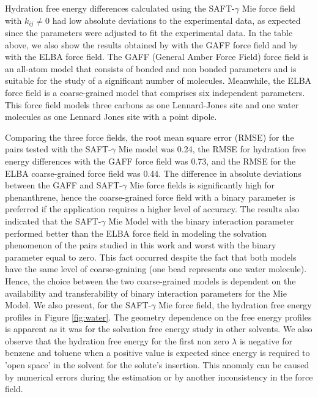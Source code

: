 Hydration free energy differences calculated using the SAFT-$\gamma$ Mie force field with $k_{ij} \neq 0$ had low absolute deviations to the experimental data, as expected since the parameters were adjusted to fit the experimental data. In the table above, we also show the results obtained by  with the GAFF force field and by  with the ELBA force field. The GAFF (General Amber Force Field) force field is an all-atom model that consists of bonded and non bonded parameters and is suitable for the study of a significant number of molecules. Meanwhile, the ELBA force field is a coarse-grained model that comprises six independent parameters. This force field models three carbons as one Lennard-Jones site and one water molecules as one Lennard Jones site with a point dipole. 

Comparing the three force fields, the root mean square error (RMSE) for the pairs tested with the SAFT-$\gamma$     Mie model was  0.24, the RMSE for hydration free energy differences with the GAFF force field was 0.73, and the RMSE for the ELBA coarse-grained force field was 0.44. The difference in absolute deviations between the GAFF and SAFT-$\gamma$     Mie force fields is significantly high for phenanthrene, hence the coarse-grained force field with a binary parameter is preferred if the application requires a higher level of accuracy. The results also indicated that the SAFT-$\gamma$ Mie Model with the binary interaction parameter performed better than the ELBA force field in modeling the solvation phenomenon of the pairs studied in this work and worst with the binary parameter equal to zero. This fact occurred despite the fact that both models have the same level of coarse-graining (one bead represents one water molecule). Hence, the choice between the two coarse-grained models is dependent on the availability and transferability of binary interaction parameters for the Mie Model. We also present, for the SAFT-$\gamma$ Mie force field, the hydration free energy profiles in Figure \ref{fig:water}. The geometry dependence on the free energy profiles is apparent as it was for the solvation free energy study in other solvents. We also observe that the hydration free energy for the first non zero $\lambda$ is negative for benzene and toluene when a positive value is expected since energy is required to 'open space' in the solvent for the solute's insertion. This anomaly can be caused by numerical errors during the estimation or by another inconsistency in the force field. 

